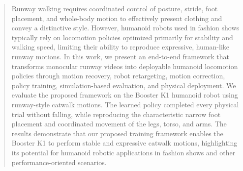 \begin{abstract}
Runway walking requires coordinated control of posture, stride, foot placement, and whole-body motion to effectively present clothing and convey a distinctive style. However, humanoid robots used in fashion shows typically rely on locomotion policies optimized primarily for stability and walking speed, limiting their ability to reproduce expressive, human-like runway motions. In this work, we present an end-to-end framework that transforms monocular runway videos into deployable humanoid locomotion policies through motion recovery, robot retargeting, motion correction, policy training, simulation-based evaluation, and physical deployment. We evaluate the proposed framework on the Booster K1 humanoid robot using runway-style catwalk motions. The learned policy completed every physical trial without falling, while reproducing the characteristic narrow foot placement and coordinated movement of the legs, torso, and arms. The results demonstrate that our proposed training framework enables the Booster K1 to perform stable and expressive catwalk motions, highlighting its potential for humanoid robotic applications in fashion shows and other performance-oriented scenarios.
\end{abstract}
